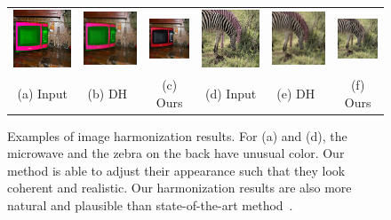 \begin{figure}[h!]
\centering
\small
\begin{tabular}{cccccc}

  \includegraphics[width=.16\textwidth]{figures/hm/000000319696_input_image.jpg}&
  \includegraphics[width=.16\textwidth]{figures/hm/000000319696_synthesized_image.jpg}&
  \includegraphics[width=.16\textwidth]{figures/hm/000000319696_synthesized_image-1.jpg}&
  \includegraphics[width=.16\textwidth]{figures/hm/000000159311_input_image.jpg}&
  \includegraphics[width=.16\textwidth]{figures/hm/000000159311_synthesized_image.jpg}&
  \includegraphics[width=.16\textwidth]{figures/hm/000000159311_synthesized_image-1.jpg} \\
  (a) Input & (b) DH~\cite{tsai2017deep}  & (c) Ours & (d) Input & (e) DH~\cite{tsai2017deep}  & (f) Ours \\
\end{tabular}
\caption{Examples of image harmonization results. For (a) and (d), the microwave and the zebra on the back have unusual color. Our method is able to adjust their appearance such that they look coherent and realistic. Our harmonization results are also more natural and plausible than state-of-the-art method~\cite{tsai2017deep}.}
\label{fig:harm}
\vspace{-10pt}
\end{figure}

